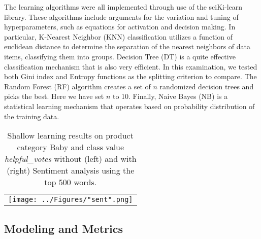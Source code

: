 \documentclass[10pt, conference, compsocconf]{IEEEtran}
\begin{document}
The learning algorithms were all implemented through use of the sciKi-learn \cite{sklearn} library. These algorithms include arguments for the variation and tuning of hyperparameters, such as equations for activation and decision making. In particular, K-Nearest Neighbor (KNN) classification utilizes a function of euclidean distance to determine the separation of the nearest neighbors of data items, classifying them into groups. Decision Tree (DT) is a quite effective classification mechanism that is also very efficient. In this examination, we tested both Gini index and Entropy functions as the splitting criterion to compare. The Random Forest (RF) algorithm creates a set of $n$ randomized decision trees and picks the best. Here we have set $n$ to 10. Finally, Naive Bayes (NB) is a statistical learning mechanism that operates based on probability distribution of the training data. 

\begin{center}
	\begin{table*}[!]
		\centering \footnotesize
		\vspace{0.01cm}
		\caption{Shallow learning results on product category Baby and class value \textit{helpful\_votes} without (left) and with (right) Sentiment analysis using the top 500 words.}
		\hspace{1cm}
		\begin{tabular}{c}
			\texttt{[image: ../Figures/"sent".png]}\\
		\end{tabular}\newline
		\vspace{-0.05cm}
		\label{Table3}
	\end{table*} \hfil
\end{center} \vspace{-6mm}

\subsection{Modeling and Metrics}
\end{document}
